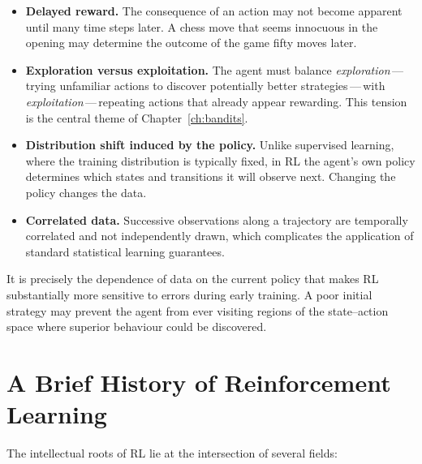 \begin{itemize}[leftmargin=*]
\item \textbf{Delayed reward.}
The consequence of an action may not become apparent until many time steps later.  A chess move that seems innocuous in the opening may determine the outcome of the game fifty moves later.

\item \textbf{Exploration versus exploitation.}
The agent must balance \emph{exploration}\,---\,trying unfamiliar actions to discover potentially better strategies\,---\,with \emph{exploitation}\,---\,repeating actions that already appear rewarding.  This tension is the central theme of Chapter~\ref{ch:bandits}.

\item \textbf{Distribution shift induced by the policy.}
Unlike supervised learning, where the training distribution is typically fixed, in RL the agent's own policy determines which states and transitions it will observe next.  Changing the policy changes the data.

\item \textbf{Correlated data.}
Successive observations along a trajectory are temporally correlated and not independently drawn, which complicates the application of standard statistical learning guarantees.
\end{itemize}

\begin{remark}
It is precisely the dependence of data on the current policy that makes RL substantially more sensitive to errors during early training.  A poor initial strategy may prevent the agent from ever visiting regions of the state--action space where superior behaviour could be discovered.
\end{remark}


\section{A Brief History of Reinforcement Learning}
\label{sec:history}

The intellectual roots of RL lie at the intersection of several fields:

